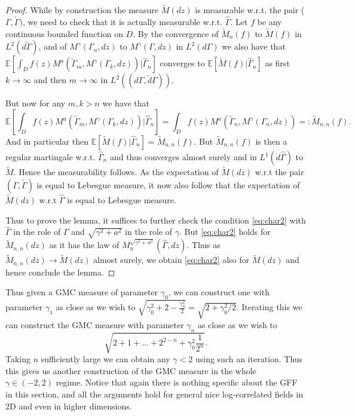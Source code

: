 \documentclass[11pt]{amsart}
\newcommand{\E}{\mathbb E}
\renewcommand{\1}{\mathbf 1}
\begin{document}
\begin{proof}
While by construction the measure $\widetilde M(dz)$ is measurable w.r.t. the pair ($\Gamma, \tilde \Gamma)$, we need to check that it is actually measurable w.r.t. $\widehat \Gamma$. Let $f$ be any continuous bounded function on $D$. By the convergence of $\widetilde M_n(f)$ to $\widetilde M(f)$ in $L^2(d\tilde \Gamma)$, and of $M^\gamma(\Gamma_n,dz)$ to $M^\gamma(\Gamma,dz)$ in $L^2(d\Gamma)$ we also have that $\E\left[\int_D f(z) M^a(\tilde \Gamma_m, M^\gamma(\Gamma_k, dz)) | \widehat \Gamma_n\right]$ converges to $\E\left[\widetilde M(f) | \widehat \Gamma_n\right]$ as first $k \to \infty$ and then $m \to \infty$ in $L^2((d\Gamma, \tilde d\Gamma))$.

But now for any $m,k > n$ we have that $$\E\left[\int_D f(z) M^a(\tilde \Gamma_m, M^\gamma(\Gamma_k, dz))|\widehat \Gamma_n \right] = \int_D f(z)M^a(\tilde \Gamma_n, M^\gamma(\Gamma_n,dz)) =: \widetilde M_{n,n}(f).$$
And in particular then $\E\left[\widetilde M(f) | \widehat \Gamma_n\right] = \widetilde M_{n,n}(f)$. But $\widetilde M_{n,n}(f)$ is then a regular martingale w.r.t. $\widehat \Gamma_n$ and thus converges almost surely and in $L^1(d\widehat \Gamma)$ to $\widetilde M$. Hence the measurability follows. As the expectation of $\widetilde M(dz)$ w.r.t the pair $(\Gamma, \tilde \Gamma)$ is equal to Lebesgue measure, it now also follow that the expectation of $\widetilde M(dz)$ w.r.t $\widehat \Gamma$ is equal to Lebesgue measure.

Thus to prove the lemma, it suffices to further check the condition \eqref{eq:char2} with $\widehat \Gamma$ in the role of $\Gamma$ and $\sqrt{\gamma^2 + a^2}$ in the role of $\gamma$. But \eqref{eq:char2} holds for $\widetilde M_{n,n}(dz)$ as it has the law of $M_n^{\sqrt{\gamma^2 + a^2}}(\widehat \Gamma,dz)$. Thus as $\widetilde M_{n,n}(dz) \to \widetilde M(dz)$ almost surely, we obtain \eqref{eq:char2} also for $\widetilde M(dz)$ and hence conclude the lemma.

\end{proof}

Thus given a GMC measure of parameter $\gamma_0$, we can construct one with parameter $\gamma_1$ as close as we wish to $\sqrt{\gamma_0^2 + 2-\frac{\gamma_0^2}{2}} = \sqrt{2+\gamma_0^2/2}$. Iterating this we can construct the GMC measure with parameter $\gamma_n$ as close as we wish to $$\sqrt{2+1+...+2^{2-n} +\gamma_0^2\frac{1}{2^n}}.$$ 
Taking $n$ sufficiently large we can obtain any $\gamma < 2$ using such an iteration. Thus this gives us another construction of the GMC measure in the whole $\gamma \in (-2, 2)$ regime. Notice that again there is nothing specific about the GFF in this section, and all the arguments hold for general nice log-correlated fields in 2D and even in higher dimensions.
\end{document}

